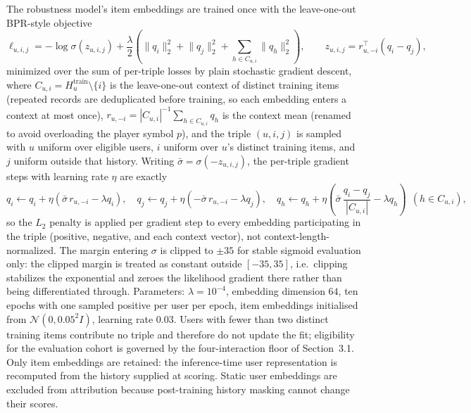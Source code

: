 \documentclass[manuscript,screen,review,anonymous]{acmart}
\begin{document}
The robustness model's item embeddings are trained once with the leave-one-out BPR-style objective
\begin{equation}
\ell_{u,i,j}=-\log\sigma\!\left(z_{u,i,j}\right)
+\frac{\lambda}{2}\left(\lVert q_i\rVert_2^2+\lVert q_j\rVert_2^2+\sum_{h\in C_{u,i}}\lVert q_h\rVert_2^2\right),
\qquad
z_{u,i,j}=r_{u,-i}^{\top}(q_i-q_j),
\label{eq:bpr}
\end{equation}
minimized over the sum of per-triple losses by plain stochastic gradient descent, where $C_{u,i}=H_u^{\mathrm{train}}\setminus\{i\}$ is the leave-one-out context of distinct training items (repeated records are deduplicated before training, so each embedding enters a context at most once), $r_{u,-i}=|C_{u,i}|^{-1}\sum_{h\in C_{u,i}}q_h$ is the context mean (renamed to avoid overloading the player symbol $p$), and the triple $(u,i,j)$ is sampled with $u$ uniform over eligible users, $i$ uniform over $u$'s distinct training items, and $j$ uniform outside that history. Writing $\bar\sigma=\sigma(-z_{u,i,j})$, the per-triple gradient steps with learning rate $\eta$ are exactly
\begin{equation}
q_i\leftarrow q_i+\eta(\bar\sigma\, r_{u,-i}-\lambda q_i),\quad
q_j\leftarrow q_j+\eta(-\bar\sigma\, r_{u,-i}-\lambda q_j),\quad
q_h\leftarrow q_h+\eta\!\left(\bar\sigma\,\frac{q_i-q_j}{|C_{u,i}|}-\lambda q_h\right)\ \ (h\in C_{u,i}),
\label{eq:bpr-gradients}
\end{equation}
so the $L_2$ penalty is applied per gradient step to every embedding participating in the triple (positive, negative, and each context vector), not context-length-normalized. The margin entering $\sigma$ is clipped to $\pm35$ for stable sigmoid evaluation only: the clipped margin is treated as constant outside $[-35,35]$, i.e.\ clipping stabilizes the exponential and zeroes the likelihood gradient there rather than being differentiated through. Parameters: $\lambda=10^{-4}$, embedding dimension $64$, ten epochs with one sampled positive per user per epoch, item embeddings initialised from $\mathcal{N}(0,0.05^2 I)$, learning rate $0.03$. Users with fewer than two distinct training items contribute no triple and therefore do not update the fit; eligibility for the evaluation cohort is governed by the four-interaction floor of Section~3.1. Only item embeddings are retained: the inference-time user representation is recomputed from the history supplied at scoring. Static user embeddings are excluded from attribution because post-training history masking cannot change their scores.
\end{document}
